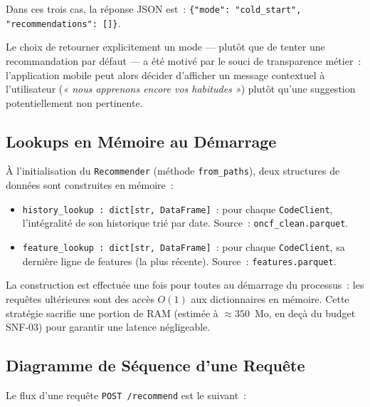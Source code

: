 \documentclass[11pt, a4paper]{article}
\begin{document}
Dans ces trois cas, la réponse JSON est~:
\texttt{\{"mode": "cold\_start", "recommendations": []\}}.

Le choix de retourner explicitement un mode --- plutôt que de tenter une
recommandation par défaut --- a été motivé par le souci de transparence
métier~: l'application mobile peut alors décider d'afficher un message
contextuel à l'utilisateur (\textit{« nous apprenons encore vos
habitudes »}) plutôt qu'une suggestion potentiellement non pertinente.

\subsection{Lookups en Mémoire au Démarrage}

À l'initialisation du \texttt{Recommender} (méthode
\texttt{from\_paths}), deux structures de données sont construites en
mémoire~:
\begin{itemize}
\item \texttt{history\_lookup~: dict[str, DataFrame]}~: pour chaque
    \texttt{CodeClient}, l'intégralité de son historique trié par date.
    Source~: \texttt{oncf\_clean.parquet}.
\item \texttt{feature\_lookup~: dict[str, DataFrame]}~: pour chaque
    \texttt{CodeClient}, sa dernière ligne de features (la plus récente).
    Source~: \texttt{features.parquet}.
\end{itemize}

La construction est effectuée une fois pour toutes au démarrage du
processus~: les requêtes ultérieures sont des accès $O(1)$ aux
dictionnaires en mémoire. Cette stratégie sacrifie une portion de RAM
(estimée à $\approx 350$~Mo, en deçà du budget SNF-03) pour garantir
une latence négligeable.

\subsection{Diagramme de Séquence d'une Requête}

Le flux d'une requête \texttt{POST /recommend} est le suivant~:
\end{document}
